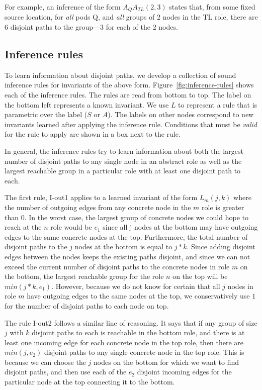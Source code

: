 \documentclass[numbers, 10pt, preprint]{sigplanconf}
\begin{document}
For example,
an inference of the form $A_{Q} A_{TL}(2,3)$ states that, from some fixed source location, for \emph{all} pods Q, and \emph{all} groups of 2 nodes in the TL role, there are 6 disjoint paths to the group---3 for each of the 2 nodes.

\subsection{Inference rules}

\newcommand{\infrule}[1]{{\small \sf #1}\xspace}

To learn information about disjoint paths, we develop a collection of sound inference rules for invariants of the above form. Figure~\ref{fig:inference-rules} shows each of the inference rules. The rules are read from bottom to top. The label on the bottom left represents a known invariant. We use $L$ to represent a rule that is parametric over the label ($S$ or $A$). The labels on other nodes correspond to new invariants learned after applying the inference rule. Conditions that must be \emph{valid} for the rule to apply are shown in a box next to the rule.

In general, the inference rules try to learn information about both the largest number of disjoint paths to any single node in an abstract role as well as the largest reachable group in a particular role with at least one disjoint path to each.

The first rule, \infrule{I-out1} applies to a learned invariant of the form $L_m(j,k)$ where the number of outgoing edges from any concrete node in the $m$ role is greater than 0. In the worst case, the largest group of concrete nodes we could hope to reach at the $n$ role would be $e_1$ since all j nodes at the bottom may have outgoing edges to the same concrete nodes at the top. Furthermore, the total number of disjoint paths to the $j$ nodes at the bottom is equal to $j*k$. Since adding disjoint edges between the nodes keeps the existing paths disjoint, and since we can not exceed the current number of disjoint paths to the concrete nodes in role $m$ on the bottom, the largest reachable group for the role $n$ on the top will be $min(j*k,e_1)$. However, because we do not know for certain that all $j$ nodes in role $m$ have outgoing edges to the same nodes at the top, we conservatively use $1$ for the number of disjoint paths to each node on top.

The rule \infrule{I-out2} follows a similar line of reasoning. It says that if any group of size $j$ with $k$ disjoint paths to each is reachable in the bottom role, and there is at least one incoming edge for each concrete node in the top role, then there are $min(j,e_2)$ disjoint paths to any single concrete node in the top role. This is because we can choose the $j$ nodes on the bottom for which we want to find disjoint paths, and then use each of the $e_2$ disjoint incoming edges for the particular node at the top connecting it to the bottom.
\end{document}
